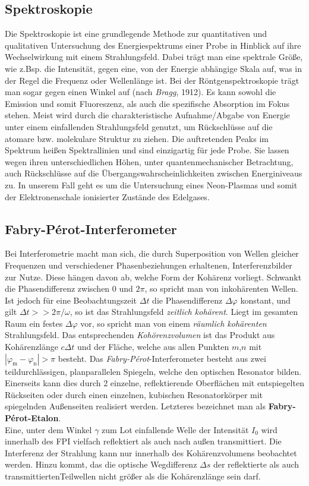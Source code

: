 \documentclass[numbers=noenddot,12pt,a4paper]{scrartcl}
\newcommand{\ix}[1]{_\text{#1}}
\newcommand{\tilt}[1]{\textit{#1}}
\newcommand{\fett}[1]{\textbf{#1}}
\begin{document}
\subsection{Spektroskopie}
Die Spektroskopie ist eine grundlegende Methode zur quantitativen und qualitativen Untersuchung des Energiespektrums einer Probe in Hinblick auf ihre Wechselwirkung mit einem Strahlungsfeld. Dabei trägt man eine spektrale Größe, wie z.Bsp. die Intensität, gegen eine, von der Energie abhängige Skala auf, was in der Regel die Frequenz oder Wellenlänge ist. Bei der Röntgenspektroskopie trägt man sogar gegen einen Winkel auf (nach \tilt{Bragg}, 1912). Es kann sowohl die Emission und somit Fluoreszenz, als auch die spezifische Absorption im Fokus stehen. Meist wird durch die charakteristische Aufnahme/Abgabe von Energie unter einem einfallenden Strahlungsfeld genutzt, um Rückschlüsse auf die atomare bzw. molekulare Struktur zu ziehen. Die auftretenden Peaks im Spektrum heißen Spektrallinien und sind einzigartig für jede Probe. Sie lassen wegen ihren unterschiedlichen Höhen, unter quantenmechanischer Betrachtung, auch Rückschlüsse auf die Übergangswahrscheinlichkeiten zwischen Energiniveaus zu. In unserem Fall geht es um die Untersuchung eines Neon-Plasmas und somit der Elektronenschale ionisierter Zustände des Edelgases.
\subsection{Fabry-Pérot-Interferometer}
Bei Interferometrie macht man sich, die durch Superposition von Wellen gleicher Frequenzen und verschiedener Phasenbeziehungen erhaltenen, Interferenzbilder zur Nutze. Diese hängen davon ab, welche Form der Kohärenz vorliegt. Schwankt die Phasendifferenz  zwischen $0$ und $2\pi$, so spricht man von inkohärenten Wellen. Ist jedoch für eine Beobachtungszeit $\Delta t$ die Phasendifferenz $\Delta \varphi$ konstant, und gilt $\Delta t>>2\pi/\omega$, so ist das Strahlungsfeld \tilt{zeitlich kohärent}. Liegt im gesamten Raum ein festes $\Delta \varphi$ vor, so spricht man von einem \tilt{räumlich kohärenten} Strahlungsfeld. Das entsprechenden \tilt{Kohörenzvolumen} ist das Produkt aus Kohärenzlänge $c\Delta t$ und der Fläche, welche aus allen Punkten $m$,$n$ mit $|\varphi\ix{m}-\varphi\ix{n}|>\pi$ besteht.
\newpage
Das \tilt{Fabry-Pérot}-Interferometer besteht aus zwei teildurchlässigen, planparallelen Spiegeln, welche den optischen Resonator bilden. Einerseits kann dies durch 2 einzelne, reflektierende Oberflächen mit entspiegelten Rückseiten oder durch einen einzelnen, kubischen Resonatorkörper mit spiegelnden Außenseiten realisiert werden. Letzteres bezeichnet man als \fett{Fabry-Pérot-Etalon}.\\
Eine, unter dem Winkel $\gamma$ zum Lot einfallende Welle der Intensität $I\ix{0}$ wird innerhalb des FPI vielfach reflektiert als auch nach außen transmittiert. Die Interferenz der Strahlung kann nur innerhalb des Kohärenzvolumens beobachtet werden. Hinzu kommt, das die optische Wegdifferenz $\Delta s$ der reflektierte als auch transmittiertenTeilwellen nicht größer als die Kohärenzlänge sein darf.
\end{document}
